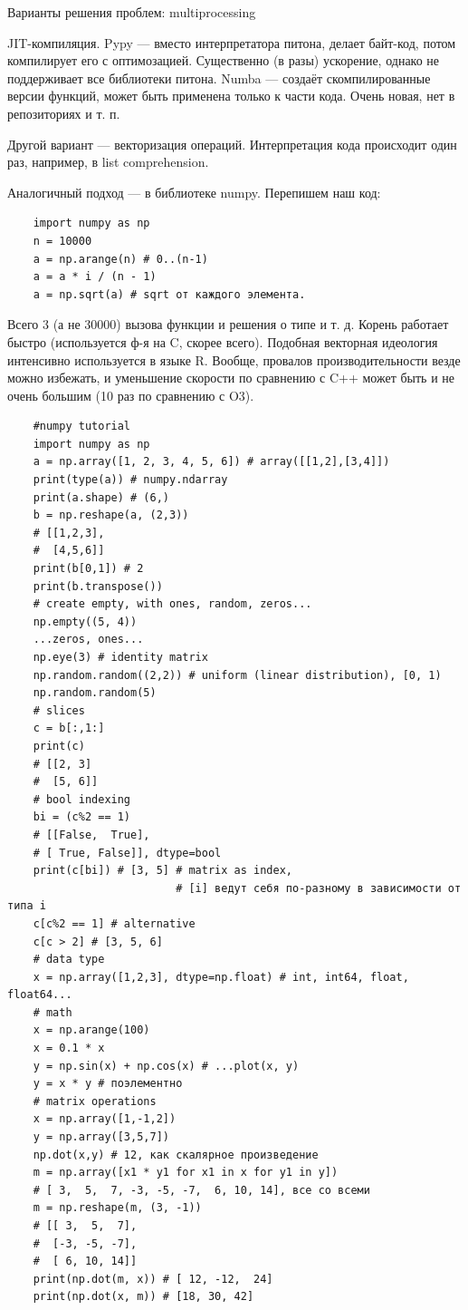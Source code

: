 \documentclass{book}
\begin{document}
Варианты решения проблем: multiprocessing

JIT-компиляция. Pypy --- вместо интерпретатора питона,
делает байт-код, потом компилирует его с оптимозацией. Существенно (в разы)
ускорение, однако не поддерживает все библиотеки питона. Numba --- создаёт
скомпилированные версии функций, может быть применена только к части кода. Очень
новая, нет в репозиториях и т. п.

Другой вариант --- векторизация операций. Интерпретация кода происходит один
раз, например, в list comprehension.

Аналогичный подход --- в библиотеке numpy. Перепишем наш код:
\begin{verbatim}
    import numpy as np
    n = 10000
    a = np.arange(n) # 0..(n-1)
    a = a * i / (n - 1)
    a = np.sqrt(a) # sqrt от каждого элемента.
\end{verbatim}
Всего 3 (а не 30000) вызова функции и решения о типе и т. д. Корень работает
быстро (используется ф-я на C, скорее всего). Подобная векторная идеология
интенсивно используется в языке R. Вообще, провалов производительности везде
можно избежать, и уменьшение скорости по сравнению с C++ может быть и не очень
большим (10 раз по сравнению с O3).

\begin{verbatim}
    #numpy tutorial
    import numpy as np
    a = np.array([1, 2, 3, 4, 5, 6]) # array([[1,2],[3,4]])
    print(type(a)) # numpy.ndarray
    print(a.shape) # (6,)
    b = np.reshape(a, (2,3))
    # [[1,2,3],
    #  [4,5,6]]
    print(b[0,1]) # 2
    print(b.transpose())
    # create empty, with ones, random, zeros...
    np.empty((5, 4))
    ...zeros, ones...
    np.eye(3) # identity matrix
    np.random.random((2,2)) # uniform (linear distribution), [0, 1)
    np.random.random(5)
    # slices
    c = b[:,1:]
    print(c)
    # [[2, 3]
    #  [5, 6]]
    # bool indexing
    bi = (c%2 == 1)
    # [[False,  True],
    # [ True, False]], dtype=bool
    print(c[bi]) # [3, 5] # matrix as index,
                          # [i] ведут себя по-разному в зависимости от типа i
    c[c%2 == 1] # alternative
    c[c > 2] # [3, 5, 6]
    # data type
    x = np.array([1,2,3], dtype=np.float) # int, int64, float, float64...
    # math
    x = np.arange(100)
    x = 0.1 * x
    y = np.sin(x) + np.cos(x) # ...plot(x, y)
    y = x * y # поэлементно
    # matrix operations
    x = np.array([1,-1,2])
    y = np.array([3,5,7])
    np.dot(x,y) # 12, как скалярное произведение
    m = np.array([x1 * y1 for x1 in x for y1 in y])
    # [ 3,  5,  7, -3, -5, -7,  6, 10, 14], все со всеми
    m = np.reshape(m, (3, -1))
    # [[ 3,  5,  7],
    #  [-3, -5, -7],
    #  [ 6, 10, 14]]
    print(np.dot(m, x)) # [ 12, -12,  24]
    print(np.dot(x, m)) # [18, 30, 42]
\end{verbatim}
\end{document}
